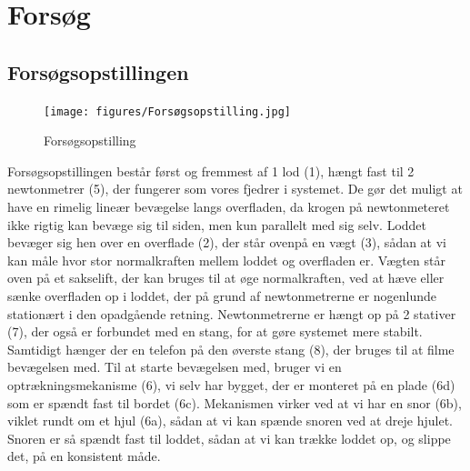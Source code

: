 \chapter{Forsøg}
\section{Forsøgsopstillingen}
\begin{figure}[htbp]
    \centering
    \texttt{[image: figures/Forsøgsopstilling.jpg]}
    \caption{Forsøgsopstilling}
    \label{fig:forsøgsopstilling}
\end{figure}
Forsøgsopstillingen består først og fremmest af 1 lod (1), hængt fast til 2 newtonmetrer (5), 
der fungerer som vores fjedrer i systemet. 
De gør det muligt at have en rimelig lineær bevægelse langs overfladen, 
da krogen på newtonmeteret ikke rigtig kan bevæge sig til siden, men kun parallelt med sig selv.
Loddet bevæger sig hen over en overflade (2), der står ovenpå en vægt (3), 
sådan at vi kan måle hvor stor normalkraften mellem loddet og overfladen er.
Vægten står oven på et sakselift, der kan bruges til at øge normalkraften, ved at hæve eller sænke overfladen op i loddet, 
der på grund af newtonmetrerne er nogenlunde stationært i den opadgående retning.
Newtonmetrerne er hængt op på 2 stativer (7), der også er forbundet med en stang, 
for at gøre systemet mere stabilt. Samtidigt hænger der en telefon på den øverste stang (8), 
der bruges til at filme bevægelsen med.
Til at starte bevægelsen med, bruger vi en optrækningsmekanisme (6), vi selv har bygget, der er monteret på en plade (6d) som er spændt fast til bordet (6c).
Mekanismen virker ved at vi har en snor (6b), viklet rundt om et hjul (6a), sådan at vi kan spænde snoren ved at dreje hjulet. 
Snoren er så spændt fast til loddet, sådan at vi kan trække loddet op, og slippe det, på en konsistent måde.
